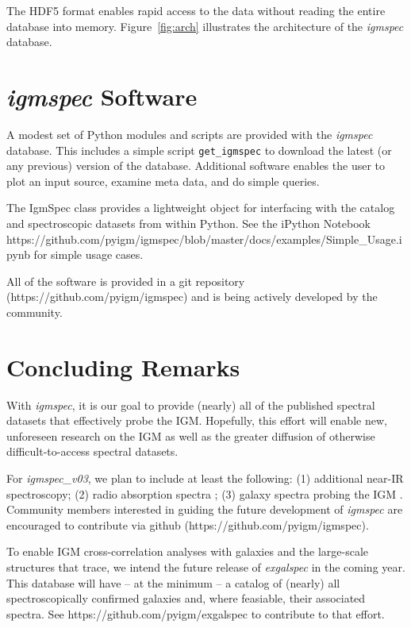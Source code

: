 \documentclass[12pt,preprint]{aastex}
\begin{document}
The HDF5 format enables rapid access to the data without
reading the entire database into memory.  
Figure~\ref{fig:arch} illustrates the 
architecture of the {\it igmspec} database.


\section{{\it igmspec} Software}
\label{sec:software}

A modest set of Python modules and scripts are provided
with the {\it igmspec} database.  This includes a simple
script {\tt get\_igmspec} to download the latest
(or any previous) version of the database.
Additional software enables the user to plot an
input source, examine meta data, and do simple queries.

The IgmSpec class provides a lightweight object for
interfacing with the catalog and spectroscopic datasets
from within Python.  See the iPython Notebook
https://github.com/pyigm/igmspec/blob/master/docs/examples/Simple\_Usage.ipynb
for simple usage cases.

All of the software is provided in a git repository
(https://github.com/pyigm/igmspec)
and is being actively developed by the community.

\section{Concluding Remarks}
\label{sec:end}

With {\it igmspec}, it is our goal to provide (nearly)
all of the published spectral datasets that effectively
probe the IGM.  Hopefully, this effort will
enable new, unforeseen research on the IGM as well
as the greater diffusion of otherwise difficult-to-access spectral
datasets.  

For {\it igmspec\_v03}, we plan to include at least the following:
(1) additional near-IR spectroscopy;
(2) radio absorption spectra \citep[e.g. 21\,cm][]{kanekar1X};
(3) galaxy spectra probing the IGM \citep[e.g.][]{rubin+16}.
Community members interested in guiding the future development
of {\it igmspec} are encouraged to contribute via github
(https://github.com/pyigm/igmspec).

To enable IGM cross-correlation analyses with galaxies
and the large-scale structures that trace,
we intend the future release of {\it exgalspec}
in the coming year.  This database will have -- at
the minimum -- a catalog of (nearly) all spectroscopically
confirmed galaxies and, where feasiable, their associated
spectra.  See https://github.com/pyigm/exgalspec
to contribute to that effort.
\end{document}
